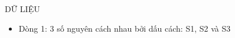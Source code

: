 DỮ LIỆU  
\begin{itemize}
	\item     Dòng 1: 3 số nguyên cách nhau bởi dấu cách: S1, S2 và S3   
\end{itemize}